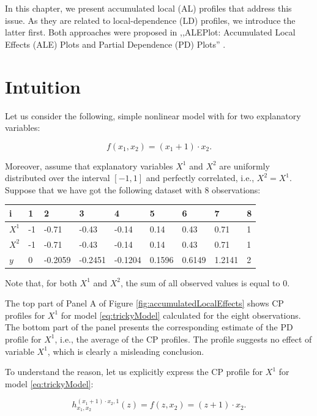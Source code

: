 \documentclass[]{krantz}
\begin{document}
In this chapter, we present accumulated local (AL) profiles that address this issue. As they are related to local-dependence (LD) profiles, we introduce the latter first. Both approaches were proposed in ,,ALEPlot: Accumulated Local Effects (ALE) Plots and Partial Dependence (PD) Plots'' \citep{ALEPlotRPackage}.

\hypertarget{ALPIntuition}{%
\section{Intuition}\label{ALPIntuition}}

Let us consider the following, simple nonlinear model with for two explanatory variables:

\begin{equation}
f(x_1, x_2) = (x_1 + 1)\cdot x_2.
\label{eq:trickyModel}
\end{equation}

Moreover, assume that explanatory variables \(X^1\) and \(X^2\) are uniformly distributed over the interval \([-1,1]\) and perfectly correlated, i.e., \(X^2 = X^1\). Suppose that we have got the following dataset with 8 observations:

\begin{longtable}[]{@{}lllllllll@{}}
\toprule
i & 1 & 2 & 3 & 4 & 5 & 6 & 7 & 8\tabularnewline
\midrule
\endhead
\(X^1\) & -1 & -0.71 & -0.43 & -0.14 & 0.14 & 0.43 & 0.71 & 1\tabularnewline
\(X^2\) & -1 & -0.71 & -0.43 & -0.14 & 0.14 & 0.43 & 0.71 & 1\tabularnewline
\(y\) & 0 & -0.2059 & -0.2451 & -0.1204 & 0.1596 & 0.6149 & 1.2141 & 2\tabularnewline
\bottomrule
\end{longtable}

Note that, for both \(X^1\) and \(X^2\), the sum of all observed values is equal to 0.

The top part of Panel A of Figure \ref{fig:accumulatedLocalEffects} shows CP profiles for \(X^1\) for model \eqref{eq:trickyModel} calculated for the eight observations. The bottom part of the panel presents the corresponding estimate of the PD profile for \(X^1\), i.e., the average of the CP profiles. The profile suggests no effect of variable \(X^1\), which is clearly a misleading conclusion.

To understand the reason, let us explicitly express the CP profile for \(X^1\) for model \eqref{eq:trickyModel}:

\begin{equation}
h^{(x_1 + 1) \cdot x_2 , 1}_{x_1,x_2}(z) = f(z,x_2) = (z+1)\cdot x_2.
\label{eq:CPtrickyModel}
\end{equation}
\end{document}
